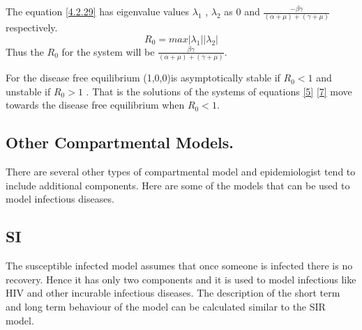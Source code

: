 The equation \ref{4.2.29} has eigenvalue values $\lambda_1$ , $\lambda_2$ as 0 and $\frac{- \beta\gamma}{(\alpha +\mu)+ (\gamma + \mu)}$ respectively.
 \begin{equation}
 R_0 = max {|\lambda_1| |\lambda_2|}
 \end{equation}
Thus the $R_0$ for the system will be $\frac{ \beta\gamma}{(\alpha +\mu)+ (\gamma + \mu)}$.

For the disease free equilibrium (1,0,0)is asymptotically stable if $R_0 < 1$ and unstable if $R_0 > 1$ \citep{van2002reproduction}. That is the solutions of the systems of equations \ref{5} \ref{7} move towards the disease free equilibrium when $R_0 < 1$.

\subsection{Other Compartmental Models.}

There are several other types of compartmental model and epidemiologist tend to include additional components. Here are some of the models that can be used to model infectious diseases.

\subsection{SI} The susceptible infected model assumes that once someone is infected there is no recovery. Hence it has only two components and it is used to model infectious like HIV and other incurable infectious diseases. The description of the short term and long term behaviour of the model can be calculated similar to the SIR model. 
 

